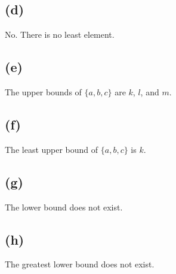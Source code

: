 \documentclass[a4paper,12pt]{article}
\begin{document}
\subsection*{(d)}

No.
There is no least element.

\subsection*{(e)}

The upper bounds of $\{a,b,c\}$ are $k$, $l$, and $m$.

\subsection*{(f)}

The least upper bound of $\{a,b,c\}$ is $k$.

\subsection*{(g)}

The lower bound does not exist.

\subsection*{(h)}

The greatest lower bound does not exist.
\end{document}
